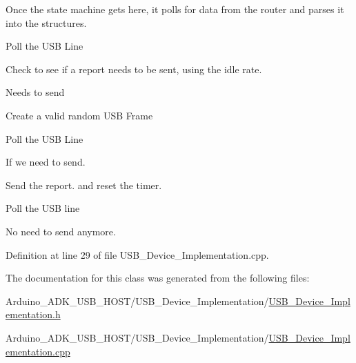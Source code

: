 Once the state machine gets here, it polls for data from the router and parses it into the structures.

Poll the U\-S\-B Line

Check to see if a report needs to be sent, using the idle rate.

Needs to send

Create a valid random U\-S\-B Frame

Poll the U\-S\-B Line

If we need to send.

Send the report. and reset the timer.

Poll the U\-S\-B line

No need to send anymore. 

Definition at line 29 of file U\-S\-B\-\_\-\-Device\-\_\-\-Implementation.\-cpp.



The documentation for this class was generated from the following files\-:\begin{DoxyCompactItemize}
\item 
Arduino\-\_\-\-A\-D\-K\-\_\-\-U\-S\-B\-\_\-\-H\-O\-S\-T/\-U\-S\-B\-\_\-\-Device\-\_\-\-Implementation/\hyperlink{_u_s_b___device___implementation_8h}{U\-S\-B\-\_\-\-Device\-\_\-\-Implementation.\-h}\item 
Arduino\-\_\-\-A\-D\-K\-\_\-\-U\-S\-B\-\_\-\-H\-O\-S\-T/\-U\-S\-B\-\_\-\-Device\-\_\-\-Implementation/\hyperlink{_u_s_b___device___implementation_8cpp}{U\-S\-B\-\_\-\-Device\-\_\-\-Implementation.\-cpp}\end{DoxyCompactItemize}
